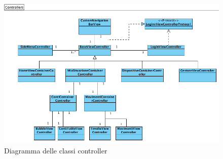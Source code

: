 \newpage
\begin{landscape}
\begin{figure}[!htbp]
\centering
\includegraphics[scale=0.70]{architettura/controllersClass.png}
\caption{Diagramma delle classi controller}
\end{figure}
\end{landscape}
